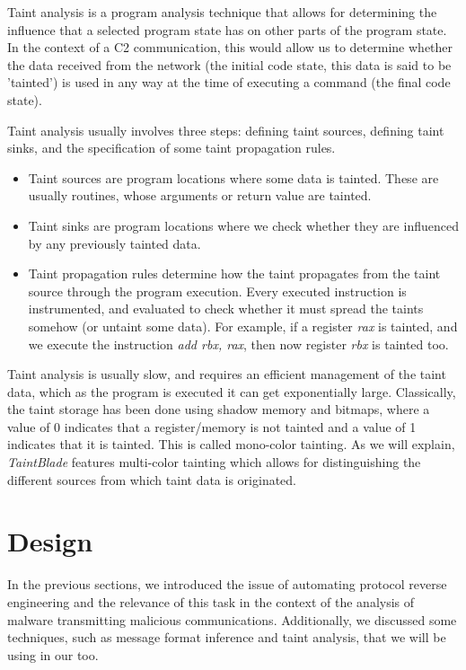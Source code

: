 \documentclass[conference]{IEEEtran}
\begin{document}
Taint analysis is a program analysis technique that allows for determining the
influence that a selected program state has on other parts of the program
state\cite{book_practical_binary_analysis}. In the context of a C2
communication, this would allow us to determine whether the data received from
the network (the initial code state, this data is said to be 'tainted') is used
in any way at the time of executing a command (the final code state).

Taint analysis usually involves three steps: defining taint sources, defining
taint sinks, and the specification of some taint propagation rules.
\begin{itemize}
    \item Taint sources are program locations where some data is tainted. These are
          usually routines, whose arguments or return value are tainted.
    \item Taint sinks are program locations where we check whether they are influenced by
          any previously tainted data.
    \item Taint propagation rules determine how the taint propagates from the taint
          source through the program execution. Every executed instruction is
          instrumented, and evaluated to check whether it must spread the taints somehow
          (or untaint some data). For example, if a register \textit{rax} is tainted, and
          we execute the instruction \textit{add rbx, rax}, then now register
          \textit{rbx} is tainted too.
\end{itemize}

Taint analysis is usually slow, and requires an efficient management of the
taint data, which as the program is executed it can get exponentially large.
Classically, the taint storage has been done using shadow memory and bitmaps,
where a value of 0 indicates that a register/memory is not tainted and a value
of 1 indicates that it is tainted. This is called mono-color tainting. As we 
will explain, \textit{TaintBlade} features multi-color tainting which allows
for distinguishing the different sources from which taint data is originated.

\section{Design}
In the previous sections, we introduced the issue of automating protocol
reverse engineering and the relevance of this task in the context of the
analysis of malware transmitting malicious communications. Additionally, we
discussed some techniques, such as message format inference and taint analysis,
that we will be using in our too.
\end{document}
